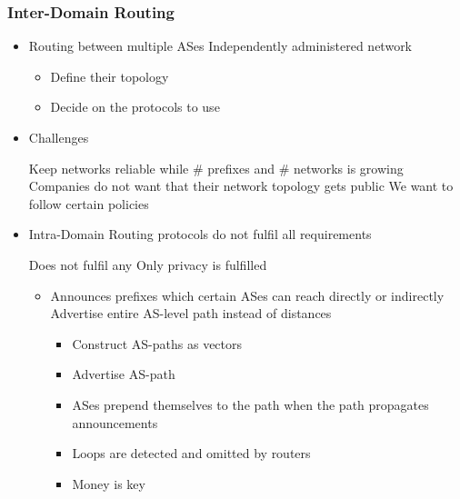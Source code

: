 \subsubsection{Inter-Domain Routing}
\begin{itemize}
    \item Routing between multiple ASes
     Independently administered network
        \begin{itemize}
            \item Define their topology
            \item Decide on the protocols to use
        \end{itemize}
    \item Challenges
        \begin{itemize}
             Keep networks reliable while $\#$ prefixes and $\#$ networks is growing
             Companies do not want that their network topology gets public
             We want to follow certain policies
        \end{itemize}
    \item Intra-Domain Routing protocols do not fulfil all requirements
        \begin{itemize}
             Does not fulfil any
             Only privacy is fulfilled
        \end{itemize}
        \begin{itemize}
            \item Announces prefixes which certain ASes can reach directly or indirectly
             Advertise entire AS-level path instead of distances
                \begin{itemize}
                    \item Construct AS-paths as vectors
                    \item Advertise AS-path
                    \item ASes prepend themselves to the path when the path propagates announcements
                    \item Loops are detected and omitted by routers
                \end{itemize}
                \begin{itemize}
                    \item Money is key

\end{itemize}
\end{itemize}
\end{itemize}
